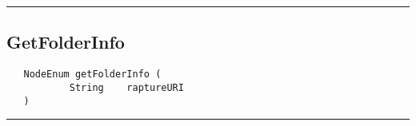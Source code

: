 \rule{15cm}{2pt}
\subsection{GetFolderInfo}
\label{Api:GetFolderInfo}
\begin{verbatim}
   NodeEnum getFolderInfo (
           String    raptureURI
   )
\end{verbatim}



\rule{15cm}{2pt}
